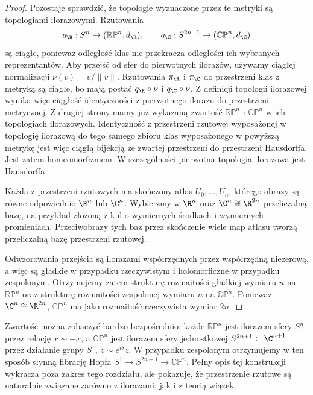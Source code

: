 \begin{proof}
Pozostaje sprawdzić, że topologie wyznaczone przez te metryki są
topologiami ilorazowymi. Rzutowania
\[
q_{\R}:S^n\to(\mathbb{RP}^n,d_{\R}),
\qquad
q_{\C}:S^{2n+1}\to(\mathbb{CP}^n,d_{\C})
\]
są ciągłe, ponieważ odległość klas nie przekracza odległości ich
wybranych reprezentantów. Aby przejść od sfer do pierwotnych ilorazów,
używamy ciągłej normalizacji $\nu(v)=v/\|v\|$.
Rzutowania $\pi_{\R}$ i $\pi_{\C}$ do przestrzeni klas z metryką są ciągłe,
bo mają postać $q_{\R}\circ\nu$ i $q_{\C}\circ\nu$.
Z definicji topologii ilorazowej wynika więc ciągłość identyczności
z pierwotnego ilorazu do przestrzeni metrycznej.
Z drugiej strony mamy już wykazaną zwartość
$\mathbb{RP}^n$ i $\mathbb{CP}^n$ w ich topologiach ilorazowych.
Identyczność z przestrzeni rzutowej wyposażonej w topologię ilorazową
do tego samego zbioru klas wyposażonego w powyższą metrykę jest więc
ciągłą bijekcją ze zwartej przestrzeni do przestrzeni Hausdorffa.
Jest zatem homeomorfizmem. W szczególności pierwotna topologia
ilorazowa jest Hausdorffa.

Każda z przestrzeni rzutowych ma skończony atlas $U_0,\ldots,U_n$,
którego obrazy są równe odpowiednio $\R^n$ lub $\C^n$. Wybierzmy
w $\R^n$ oraz $\C^n\cong\R^{2n}$ przeliczalną bazę, na przykład
złożoną z kul o wymiernych środkach i wymiernych promieniach.
Przeciwobrazy tych baz przez skończenie wiele map atlasu tworzą
przeliczalną bazę przestrzeni rzutowej.

Odwzorowania przejścia są ilorazami współrzędnych przez współrzędną
niezerową, a więc są gładkie w przypadku rzeczywistym i holomorficzne
w przypadku zespolonym. Otrzymujemy zatem strukturę rozmaitości
gładkiej wymiaru $n$ na $\mathbb{RP}^n$ oraz strukturę rozmaitości
zespolonej wymiaru $n$ na $\mathbb{CP}^n$. Ponieważ $\C^n\cong\R^{2n}$,
$\mathbb{CP}^n$ ma jako rozmaitość rzeczywista wymiar $2n$.
\end{proof}


\begin{uwaga}
Zwartość można zobaczyć bardzo bezpośrednio: każde $\mathbb{RP}^n$ jest ilorazem
sfery $S^n$ przez relację $x\sim-x$, a $\mathbb{CP}^n$ jest ilorazem sfery
jednostkowej $S^{2n+1}\subset\C^{n+1}$ przez działanie grupy $S^1$, $z\sim e^{i\theta}z$.
W przypadku zespolonym otrzymujemy w ten sposób słynną fibrację Hopfa
$S^1\longrightarrow S^{2n+1}\longrightarrow\mathbb{CP}^n$.
Pełny opis tej konstrukcji wykracza poza zakres tego rozdziału, ale pokazuje,
że przestrzenie rzutowe są naturalnie związane zarówno z ilorazami, jak i z teorią
wiązek.
\end{uwaga}

